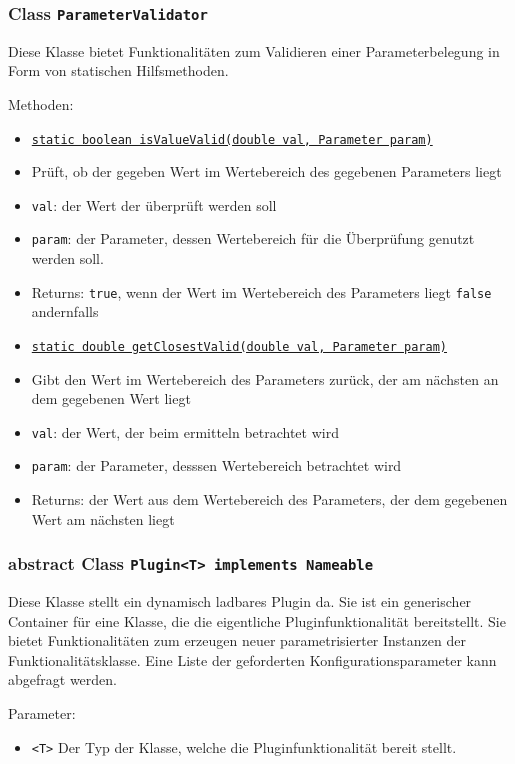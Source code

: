 \documentclass[parskip=full,11pt]{scrartcl}
\begin{document}
\subsubsection{Class \texttt{ParameterValidator}}

Diese Klasse bietet Funktionalitäten zum Validieren einer Parameterbelegung in Form von statischen Hilfsmethoden.

Methoden:

\begin{itemize} \itemsep -10pt
	\item \underline{\texttt{static boolean isValueValid(double val, Parameter param)}}
	\item[] Prüft, ob der gegeben Wert im Wertebereich des gegebenen Parameters liegt
	\item[] \texttt{val}: der Wert der überprüft werden soll
	\item[] \texttt{param}: der Parameter, dessen Wertebereich für die Überprüfung genutzt werden soll.
	\item[] Returns: \texttt{true}, wenn der Wert im Wertebereich des Parameters liegt \texttt{false} andernfalls
	\item \underline{\texttt{static double getClosestValid(double val, Parameter param)}}
	\item[] Gibt den Wert im Wertebereich des Parameters zurück, der am nächsten an dem gegebenen Wert liegt
	\item[] \texttt{val}: der Wert, der beim ermitteln betrachtet wird
	\item[] \texttt{param}: der Parameter, desssen Wertebereich betrachtet wird
	\item[] Returns: der Wert aus dem Wertebereich des Parameters, der dem gegebenen Wert am nächsten liegt
\end{itemize}

\subsubsection{abstract Class \texttt{Plugin<T> implements  Nameable}}

Diese Klasse stellt ein dynamisch ladbares Plugin da. Sie ist ein generischer Container für eine Klasse, die die eigentliche Pluginfunktionalität bereitstellt. Sie bietet Funktionalitäten zum erzeugen neuer parametrisierter Instanzen der Funktionalitätsklasse. Eine Liste der geforderten Konfigurationsparameter kann abgefragt werden.

Parameter:
\begin{itemize}\itemsep -10pt
	\item \texttt{<T>} Der Typ der Klasse, welche die Pluginfunktionalität bereit stellt. 
\end{itemize}
\end{document}
